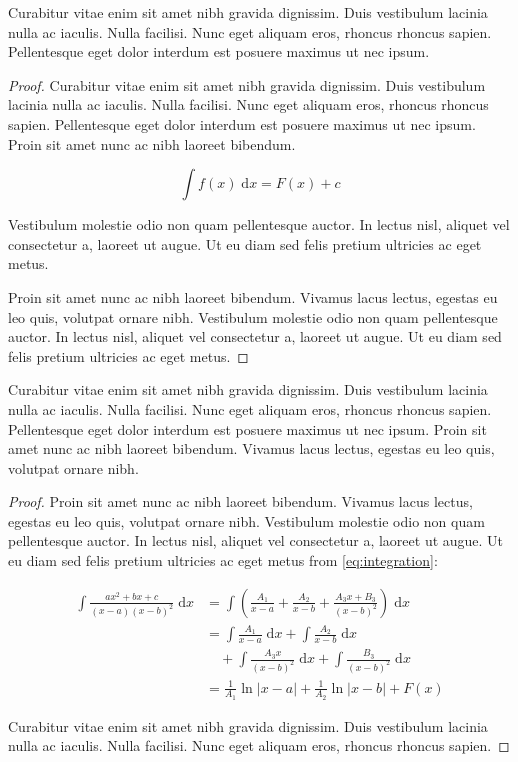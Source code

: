 \begin{lemma}
Curabitur vitae enim sit amet nibh gravida dignissim. Duis vestibulum lacinia nulla ac iaculis. Nulla facilisi. Nunc eget aliquam eros, rhoncus rhoncus sapien. Pellentesque eget dolor interdum est posuere maximus ut nec ipsum.
\end{lemma}

\begin{proof}
Curabitur vitae enim sit amet nibh gravida dignissim. Duis vestibulum lacinia nulla ac iaculis. Nulla facilisi. Nunc eget aliquam eros, rhoncus rhoncus sapien. Pellentesque eget dolor interdum est posuere maximus ut nec ipsum. Proin sit amet nunc ac nibh laoreet bibendum. 

\[ \int f(x) \;\mathrm{d}x = F(x) + c \]

Vestibulum molestie odio non quam pellentesque auctor. In lectus nisl, aliquet vel consectetur a, laoreet ut augue. Ut eu diam sed felis pretium ultricies ac eget metus.

Proin sit amet nunc ac nibh laoreet bibendum. Vivamus lacus lectus, egestas eu leo quis, volutpat ornare nibh. Vestibulum molestie odio non quam pellentesque auctor. In lectus nisl, aliquet vel consectetur a, laoreet ut augue. Ut eu diam sed felis pretium ultricies ac eget metus.
\end{proof}

\begin{theorem}[Curabitur]
Curabitur vitae enim sit amet nibh gravida dignissim. Duis vestibulum lacinia nulla ac iaculis. Nulla facilisi. Nunc eget aliquam eros, rhoncus rhoncus sapien. Pellentesque eget dolor interdum est posuere maximus ut nec ipsum. Proin sit amet nunc ac nibh laoreet bibendum. Vivamus lacus lectus, egestas eu leo quis, volutpat ornare nibh.
\end{theorem}

\begin{proof}
Proin sit amet nunc ac nibh laoreet bibendum. Vivamus lacus lectus, egestas eu leo quis, volutpat ornare nibh. Vestibulum molestie odio non quam pellentesque auctor. In lectus nisl, aliquet vel consectetur a, laoreet ut augue. Ut eu diam sed felis pretium ultricies ac eget metus from \eqref{eq:integration}:

\begin{align}
\int \frac{ax^2+bx+c}{(x-a)(x-b)^2} \;\mathrm{d}x
& = \int \left( \frac{A_1}{x-a} + \frac{A_2}{x-b} + \frac{A_3x+B_3}{(x-b)^2} \right) \;\mathrm{d}x
\\ \nonumber
& = \int \frac{A_1}{x-a} \;\mathrm{d}x + \int \frac{A_2}{x-b} \;\mathrm{d}x 
\\
& \quad + \int \frac{A_3x}{(x-b)^2} \;\mathrm{d}x + \int \frac{B_3}{(x-b)^2} \;\mathrm{d}x
\\
& = \frac{1}{A_1} \ln \lvert x-a \rvert + \frac{1}{A_2}\ln \lvert x-b \rvert + F(x)
\end{align}

Curabitur vitae enim sit amet nibh gravida dignissim. Duis vestibulum lacinia nulla ac iaculis. Nulla facilisi. Nunc eget aliquam eros, rhoncus rhoncus sapien. 	
\end{proof}

